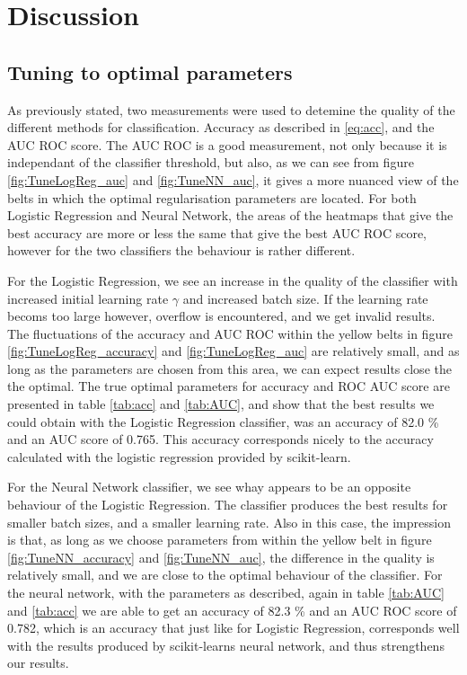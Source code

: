 \section{Discussion}
\label{sec:discussion}

\subsection{Tuning to optimal parameters}
As previously stated, two measurements were used to detemine the quality of the different methods for classification. Accuracy as described in \eqref{eq:acc}, and the AUC ROC score. The AUC ROC is a good measurement, not only because it is independant of the classifier threshold, but also, as we can see from figure \ref{fig:TuneLogReg_auc} and \ref{fig:TuneNN_auc}, it gives a more nuanced view of the belts in which the optimal regularisation parameters are located. For both Logistic Regression and Neural Network, the areas of the heatmaps that give the best accuracy are more or less the same that give the best AUC ROC score, however for the two classifiers the behaviour is rather different.

For the Logistic Regression, we see an increase in the quality of the classifier with increased initial learning rate $\gamma$ and increased batch size. If the learning rate becoms too large however, overflow is encountered, and we get invalid results. The fluctuations of the accuracy and AUC ROC within the yellow belts in figure \ref{fig:TuneLogReg_accuracy} and \ref{fig:TuneLogReg_auc} are relatively small, and as long as the parameters are chosen from this area, we can expect results close the the optimal. The true optimal parameters for accuracy and ROC AUC score are presented in table \ref{tab:acc} and \ref{tab:AUC}, and show that the best results we could obtain with the Logistic Regression classifier, was an accuracy of 82.0 \% and an AUC score of 0.765. This accuracy corresponds nicely to the accuracy calculated with the logistic regression provided by scikit-learn.

For the Neural Network classifier, we see whay appears to be an opposite behaviour of the Logistic Regression. The classifier produces the best results for smaller batch sizes, and a smaller learning rate. Also in this case, the impression is that, as long as we choose parameters from within the yellow belt in figure \ref{fig:TuneNN_accuracy} and \ref{fig:TuneNN_auc}, the difference in the quality is relatively small, and we are close to the optimal behaviour of the classifier. For the neural network, with the parameters as described, again in table \ref{tab:AUC} and \ref{tab:acc} we are able to get an accuracy of 82.3 \% and an AUC ROC score of 0.782, which is an accuracy that just like for Logistic Regression, corresponds well with the results produced by scikit-learns neural network, and thus strengthens our results.

